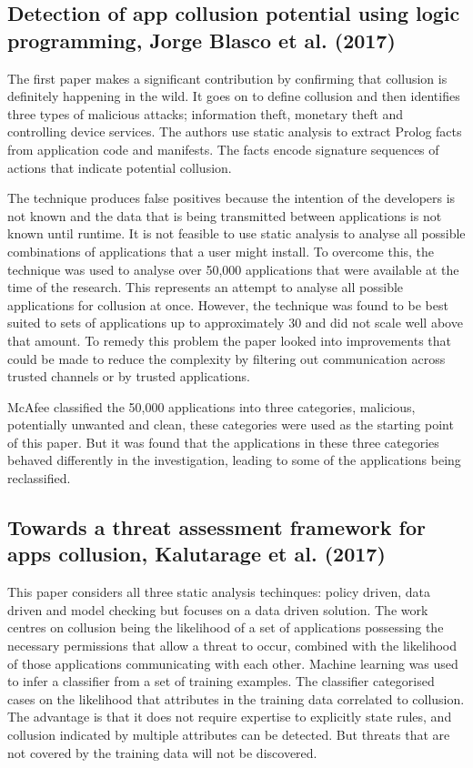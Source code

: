 \subsection{Detection of app collusion potential using logic programming, Jorge Blasco et al. (2017) \cite{PrologAppCollusion}}

The first paper makes a significant contribution by confirming that collusion is definitely happening in the wild.  It goes on to define collusion and then identifies three types of malicious attacks; information theft, monetary theft and controlling device services.  The authors use static analysis to extract Prolog facts from application code and manifests.  The facts encode signature sequences of actions that indicate potential collusion.  

The technique produces false positives because the intention of the developers is not known and the data that is being transmitted between applications is not known until runtime.  It is not feasible to use static analysis to analyse all possible combinations of applications that a user might install.  To overcome this, the technique was used to analyse over 50,000 applications that were available at the time of the research.  This represents an attempt to analyse all possible applications for collusion at once.  However, the technique was found to be best suited to sets of applications up to approximately 30 and did not scale well above that amount.  To remedy this problem the paper looked into improvements that could be made to reduce the complexity by filtering out communication across trusted channels or by trusted applications.

McAfee classified the 50,000 applications into three categories, malicious, potentially unwanted and clean, these categories were used as the starting point of this paper.  But it was found that the applications in these three categories behaved differently in the investigation, leading to some of the applications being reclassified.

\subsection{Towards a threat assessment framework for apps collusion, Kalutarage et al. (2017) \cite{ThreatAssesmentAppCollusion}}

This paper considers all three static analysis techinques: policy driven, data driven and model checking but focuses on a data driven solution.  The work centres on collusion being the likelihood of a set of applications possessing the necessary permissions that allow a threat to occur, combined with the likelihood of those applications communicating with each other.   Machine learning was used to infer a classifier from a set of training examples.  The classifier categorised cases on the likelihood that attributes in the training data correlated to collusion.  The advantage is that it does not require expertise to explicitly state rules, and collusion indicated by multiple attributes can be detected.  But threats that are not covered by the training data will not be discovered.

